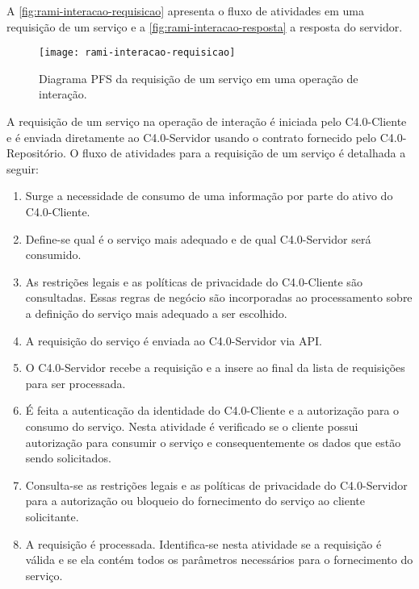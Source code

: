 A \autoref{fig:rami-interacao-requisicao} apresenta o fluxo de atividades em uma requisição de um serviço e a \autoref{fig:rami-interacao-resposta} a resposta do servidor.

\begin{figure}[htb]
	\centering
	\texttt{[image: rami-interacao-requisicao]}
	\caption{Diagrama PFS da requisição de um serviço em uma operação de interação.}
	\label{fig:rami-interacao-requisicao}
\end{figure}

A requisição de um serviço na operação de interação é iniciada pelo C4.0-Cliente e é enviada diretamente ao C4.0-Servidor usando o contrato fornecido pelo C4.0-Repositório. O fluxo de atividades para a requisição de um serviço é detalhada a seguir:

\begin{enumerate}

	\item Surge a necessidade de consumo de uma informação por parte do ativo do C4.0-Cliente.

	\item Define-se qual é o serviço mais adequado e de qual C4.0-Servidor será consumido.

	\item As restrições legais e as políticas de privacidade do C4.0-Cliente são consultadas. Essas regras de negócio são incorporadas ao processamento sobre a definição do serviço mais adequado a ser escolhido.

	\item A requisição do serviço é enviada ao C4.0-Servidor via API.

	\item O C4.0-Servidor recebe a requisição e a insere ao final da lista de requisições para ser processada.

	\item É feita a autenticação da identidade do C4.0-Cliente e a autorização para o consumo do serviço. Nesta atividade é verificado se o cliente possui autorização para consumir o serviço e consequentemente os dados que estão sendo solicitados.

	\item Consulta-se as restrições legais e as políticas de privacidade do C4.0-Servidor para a autorização ou bloqueio do fornecimento do serviço ao cliente solicitante.

	\item A requisição é processada. Identifica-se nesta atividade se a requisição é válida e se ela contém todos os parâmetros necessários para o fornecimento do serviço.

\end{enumerate}

